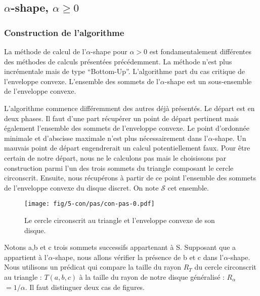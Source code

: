 \subsection{$\alpha$-shape, $\alpha \geq 0$}

\subsubsection{Construction de l'algorithme}

La méthode de calcul de l'$\alpha$-shape pour $\alpha > 0$ est fondamentalement différentes des méthodes de calculs présentées précédemment. La méthode n'est plus incrémentale mais de type ``Bottom-Up''. L'algorithme part du cas critique de l'enveloppe convexe. L'ensemble des sommets de l'$\alpha$-shape est un sous-ensemble de l'enveloppe convexe. 

L'algorithme commence différemment des autres déjà présentés. Le départ est en deux phases. Il faut d'une part récupérer un point de départ pertinent mais également l'ensemble des sommets de l'enveloppe convexe. Le point d'ordonnée minimale et d'abscisse maximale n'est plus nécessairement dans l'$\alpha$-shape. Un mauvais point de départ engendrerait un calcul potentiellement faux. Pour être certain de notre départ, nous ne le calculons pas mais le choisissons par construction parmi l'un des trois sommets du triangle composant le cercle circonscrit. Ensuite, nous récupérons à partir de ce point l'ensemble des sommets de l'enveloppe convexe du disque discret. On note $\mathcal{S}$ cet ensemble.

\begin{figure}[H]
  \centering
  \texttt{[image: fig/5-con/pas/con-pas-0.pdf]}
  \caption{Le cercle circonscrit au triangle et l'enveloppe convexe de son disque.}
\end{figure}


Notons a,b et c trois sommets successifs appartenant à S. Supposant que a appartient à l'$\alpha$-shape, nous allons vérifier la présence de b et c dans l'$\alpha$-shape. Nous utilisons un prédicat qui compare la taille du rayon \textbf{$R_T$} du cercle circonscrit au triangle : $T(a, b, c)$ à la taille du rayon de notre disque généralisé : \textbf{$R_{\alpha}$} $= 1/\alpha$. Il faut distinguer deux cas de figures.\\

